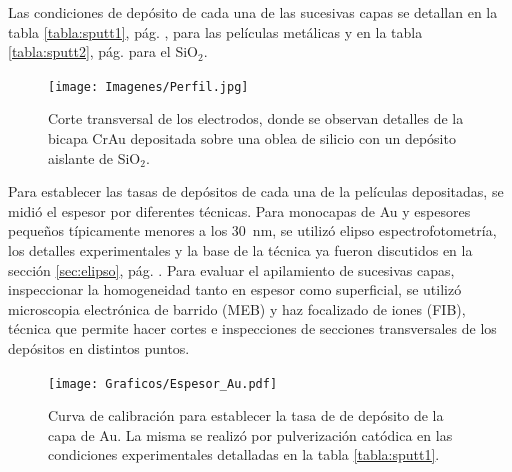 		 Las condiciones de depósito de cada una de las sucesivas capas se detallan en la tabla \ref{tabla:sputt1}, pág. \pageref{tabla:sputt1}, para las películas metálicas y en la tabla  \ref{tabla:sputt2}, pág. \pageref{tabla:sputt2} para el SiO$_2$. 

						  \begin{figure}[ht!]
						  \begin{center}
						  \texttt{[image: Imagenes/Perfil.jpg]}
						  \caption[Sección trasversal de los eletrodos]{Corte transversal de los electrodos, donde se observan detalles de la bicapa Cr\textbar Au depositada sobre una oblea de silicio con un depósito aislante de SiO$_2$.}
						  \label{fig:FIB_electrodos}
						  \end{center}
						  \end{figure} 	

		 Para establecer las tasas de depósitos de cada una de la películas depositadas, se midió el espesor por diferentes técnicas. Para monocapas de Au y espesores pequeños típicamente menores a los \SI{30}{\nm}, se utilizó elipso espectrofotometría, los detalles experimentales y la base de la técnica ya fueron discutidos en la sección \ref{sec:elipso}, pág. \pageref{sec:elipso}. Para evaluar el apilamiento de sucesivas capas, inspeccionar la homogeneidad tanto en espesor como superficial, se utilizó microscopia electrónica de barrido (MEB) y haz focalizado de iones (FIB), técnica que permite hacer cortes e inspecciones de secciones transversales de los depósitos en distintos puntos. 

					   		\begin{figure}[ht!]
					   		\begin{center}
							\texttt{[image: Graficos/Espesor\_Au.pdf]}
							\caption[Curca de calibrado para el espesor de los electrodos]{Curva de calibración para establecer la tasa de de depósito de la capa de Au. La misma se realizó por pulverización catódica en las condiciones experimentales detalladas en la tabla \ref{tabla:sputt1}.}
							\label{fig:calibracionAu}
							\end{center}
							\end{figure}
		
